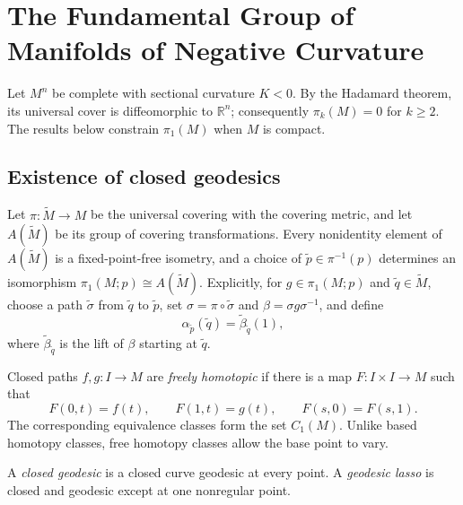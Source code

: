 \chapter{The Fundamental Group of Manifolds of Negative Curvature}
\label{chap:dc-fundamental-group-negative-curvature}

Let $M^n$ be complete with sectional curvature $K<0$. By the Hadamard theorem,
its universal cover is diffeomorphic to $\mathbb{R}^n$; consequently
$\pi_k(M)=0$ for $k\geq 2$. The results below constrain $\pi_1(M)$ when $M$ is
compact.

\section{Existence of closed geodesics}

Let $\pi:\tilde M\to M$ be the universal covering with the covering metric, and
let $A(\tilde M)$ be its group of covering transformations. Every nonidentity
element of $A(\tilde M)$ is a fixed-point-free isometry, and a choice of
$\tilde p\in\pi^{-1}(p)$ determines an isomorphism
$\pi_1(M;p)\cong A(\tilde M)$. Explicitly, for $g\in\pi_1(M;p)$ and
$\tilde q\in\tilde M$, choose a path $\tilde\sigma$ from $\tilde q$ to
$\tilde p$, set $\sigma=\pi\circ\tilde\sigma$ and
$\beta=\sigma g\sigma^{-1}$, and define
\[
  \alpha_{\tilde p}(\tilde q)=\tilde\beta_{\tilde q}(1),
\]
where $\tilde\beta_{\tilde q}$ is the lift of $\beta$ starting at $\tilde q$.

\begin{definition}
  \label{def:dc-ch12-2-1}
  Closed paths $f,g:I\to M$ are \emph{freely homotopic} if there is a map
  $F:I\times I\to M$ such that
  \[
    F(0,t)=f(t),\qquad F(1,t)=g(t),\qquad F(s,0)=F(s,1).
  \]
  The corresponding equivalence classes form the set $C_1(M)$. Unlike based
  homotopy classes, free homotopy classes allow the base point to vary.

  A \emph{closed geodesic} is a closed curve geodesic at every point. A
  \emph{geodesic lasso} is closed and geodesic except at one nonregular point.
\end{definition}

